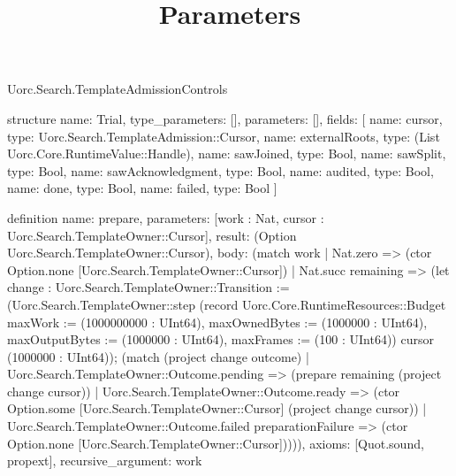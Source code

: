 \begin{lexlean}{Uorc.Search.TemplateAdmissionControls}
\title{Parameters}
\begin{semanticmodule}
structure{
  name: Trial,
  type_parameters: [],
  parameters: [],
  fields: [
    {name: cursor, type: Uorc.Search.TemplateAdmission::Cursor},
    {name: externalRoots, type: (List Uorc.Core.RuntimeValue::Handle)},
    {name: sawJoined, type: Bool},
    {name: sawSplit, type: Bool},
    {name: sawAcknowledgment, type: Bool},
    {name: audited, type: Bool},
    {name: done, type: Bool},
    {name: failed, type: Bool}
  ]
}

definition{
  name: prepare,
  parameters: [work : Nat, cursor : Uorc.Search.TemplateOwner::Cursor],
  result: (Option Uorc.Search.TemplateOwner::Cursor),
  body: (match work
    | Nat.zero => (ctor Option.none [Uorc.Search.TemplateOwner::Cursor])
    | Nat.succ remaining => (let change : Uorc.Search.TemplateOwner::Transition := (Uorc.Search.TemplateOwner::step (record Uorc.Core.RuntimeResources::Budget {maxWork := (1000000000 : UInt64), maxOwnedBytes := (1000000 : UInt64), maxOutputBytes := (1000000 : UInt64), maxFrames := (100 : UInt64)}) cursor (1000000 : UInt64)); (match (project change outcome)
      | Uorc.Search.TemplateOwner::Outcome.pending => (prepare remaining (project change cursor))
      | Uorc.Search.TemplateOwner::Outcome.ready => (ctor Option.some [Uorc.Search.TemplateOwner::Cursor] (project change cursor))
      | Uorc.Search.TemplateOwner::Outcome.failed preparationFailure => (ctor Option.none [Uorc.Search.TemplateOwner::Cursor])))),
  axioms: [Quot.sound, propext],
  recursive_argument: work
}


\end{semanticmodule}
\end{lexlean}
